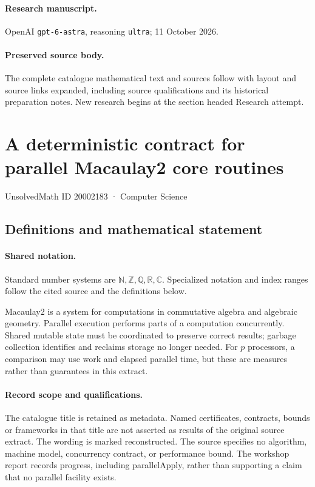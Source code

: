 \documentclass[11pt]{article}
\begin{document}
\paragraph{Research manuscript.} OpenAI \texttt{gpt-6-astra}, reasoning \texttt{ultra}; 11 October 2026.
\paragraph{Preserved source body.} The complete catalogue mathematical text and sources follow with layout and source links expanded, including source qualifications and its historical preparation notes. New research begins at the section headed Research attempt.

\section{A deterministic contract for parallel Macaulay2 core routines}\label{20002183}
{\small UnsolvedMath ID 20002183 · Computer Science}
\subsection{Definitions and mathematical statement}

\paragraph{Shared notation.}Standard number systems are $\mathbb N,\mathbb Z,\mathbb Q,\mathbb R,\mathbb C$. Specialized notation and index ranges follow the cited source and the definitions below.


Macaulay2 is a system for computations in commutative algebra and algebraic geometry. Parallel execution performs parts of a computation concurrently. Shared mutable state must be coordinated to preserve correct results; garbage collection identifies and reclaims storage no longer needed. For $p$ processors, a comparison may use work and elapsed parallel time, but these are measures rather than guarantees in this extract.
\paragraph{Record scope and qualifications.}
The catalogue title is retained as metadata. Named certificates, contracts, bounds or frameworks in that title are not asserted as results of the original source extract.
The wording is marked reconstructed. The source specifies no algorithm, machine model, concurrency contract, or performance bound. The workshop report records progress, including parallelApply, rather than supporting a claim that no parallel facility exists.
\end{document}
